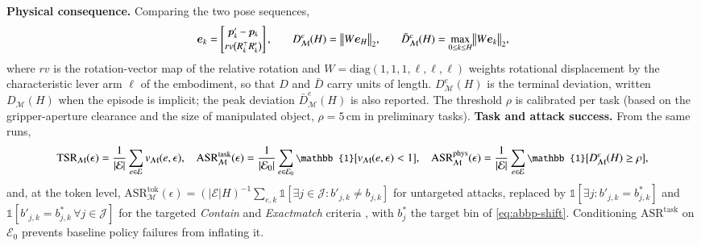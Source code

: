  \textbf{Physical consequence.} Comparing the two pose sequences,
\vspace{-1ex}\begin{equation}
  \small
\bm{e}_{k}=\begin{bmatrix}\bm{p}'_{k}-\bm{p}_{k}\\[2pt] rv\bigl(R_{k}^{\top}R'_{k}\bigr)\end{bmatrix},
\qquad
D^{e}_{\mathcal{M}}(H)=\bigl\|W\bm{e}_{H}\bigr\|_{2},
\qquad
\bar{D}^{e}_{\mathcal{M}}(H)=\max_{0\le k\le H}\bigl\|W\bm{e}_{k}\bigr\|_{2},
\label{eq:abbp-gate}
\vspace{-1.5ex}\end{equation}
where $rv$ is the rotation-vector map of the relative rotation and $W=\mathrm{diag}(1,1,1, \ell,\ell,\ell)$ weights rotational displacement by the characteristic lever arm $\ell$ of the embodiment, so that $D$ and $\bar{D}$ carry units of length. $D^{e}_{\mathcal{M}}(H)$ is the terminal deviation, written $D_{\mathcal{M}}(H)$ when the episode is implicit; the peak deviation $\bar{D}^{e}_{\mathcal{M}}(H)$ is also reported. The threshold $\rho$ is calibrated per task (\ie based on the gripper-aperture clearance and the size of manipulated object, \eg $\rho{=}5$\,cm in preliminary tasks).
 \textbf{Task and attack success.} From the same runs,
\vspace{-1ex}\begin{equation}
  \small
\mathrm{TSR}_{\mathcal{M}}(\epsilon)=\frac{1}{|\mathcal{E}|}\sum_{e\in\mathcal{E}}
v_{\mathcal{M}}(e,\epsilon),
\quad
\mathrm{ASR}^{\mathrm{task}}_{\mathcal{M}}(\epsilon)=\frac{1}{|\mathcal{E}_{0}|}
\sum_{e\in\mathcal{E}_{0}}\mathbb{1}\bigl[v_{\mathcal{M}}(e,\epsilon)<1\bigr],
\quad
\mathrm{ASR}^{\mathrm{phys}}_{\mathcal{M}}(\epsilon)=\frac{1}{|\mathcal{E}|}
\sum_{e\in\mathcal{E}}\mathbb{1}\bigl[D^{e}_{\mathcal{M}}(H)\ge\rho\bigr],
\label{eq:metric-stack}
\vspace{-1.5ex}\end{equation}
and, at the token level,
$\mathrm{ASR}^{\mathrm{tok}}_{\mathcal{M}}(\epsilon)=(|\mathcal{E}|H)^{-1}\sum_{e,k}
\mathbb{1}[\exists j\in\mathcal{J}:b'_{j,k}\neq b_{j,k}]$ for untargeted attacks, replaced by
$\mathbb{1}[\exists j:b'_{j,k}{=}b^{*}_{j,k}]$ and $\mathbb{1}[b'_{j,k}{=}b^{*}_{j,k}\,\forall
j\in\mathcal{J}]$ for the targeted \textit{Contain} and \textit{Exactmatch} criteria
\cite{lu2024test,luo2024image}, with $b^{*}_{j}$ the target bin of \autoref{eq:abbp-shift}.
Conditioning $\mathrm{ASR}^{\mathrm{task}}$ on $\mathcal{E}_{0}$ prevents baseline policy
failures from inflating it. 

